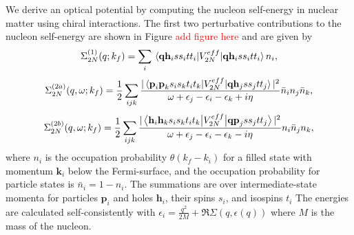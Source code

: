 \documentclass[preprintnumbers,floatfix,aps,prc,preprint,nofootinbib]{revtex4-1}
\begin{document}
We derive an optical potential by computing the nucleon self-energy in nuclear matter using chiral interactions. The first two perturbative contributions to the nucleon self-energy are shown in Figure \textcolor{red}{add figure here} and are given by
%
\begin{eqnarray}
	\label{eq:nucleon_self_energy_1}
	\Sigma_{2N}^{(1)} (q; k_f) = \sum_i \mel{\textbf{q} \textbf{h}_i s s_i t t_i}{V_{2N}^{eff}}{\textbf{q} \textbf{h}_i s s_i t t_i} n_i,
\end{eqnarray}
%
\begin{eqnarray}
	\label{eq:nucleon_self_energy_2a}
	\Sigma_{2N}^{(2a)} (q, \omega; k_f) = \frac{1}{2} \sum_{ijk} \frac{|\mel{\textbf{p}_i \textbf{p}_k s_i s_k t_i t_k}{V_{2N}^{eff}}{\textbf{q} \textbf{h}_j s s_j t t_j}|^2}{\omega+\epsilon_j-\epsilon_i-\epsilon_k+i \eta} \bar{n}_i n_j \bar{n}_k,
\end{eqnarray}
%
\begin{eqnarray}
	\label{eq:nucleon_self_energy_2b}
	\Sigma_{2N}^{(2b)} (q, \omega; k_f) = \frac{1}{2} \sum_{ijk} \frac{|\mel{\textbf{h}_i \textbf{h}_k s_i s_k t_i t_k}{V_{2N}^{eff}}{\textbf{q} \textbf{p}_j s s_j t t_j}|^2}{\omega+\epsilon_j-\epsilon_i-\epsilon_k-i \eta} n_i \bar{n}_j n_k,
\end{eqnarray}
%
where $n_i$ is the occupation probability $\theta(k_f - k_i)$ for a filled state with momentum $\textbf{k}_i$ below the Fermi-surface, and the occupation probability for particle states is $\bar{n}_i = 1 - n_i$. The summations are over intermediate-state momenta for particles $\textbf{p}_i$ and holes $\textbf{h}_i$, their spins $s_i$, and isospins $t_i$ The energies are calculated self-consistently with $\epsilon_i = \frac{q^2}{2 M} + \Re \Sigma(q, \epsilon(q))$ where $M$ is the mass of the nucleon.
\\
\end{document}
